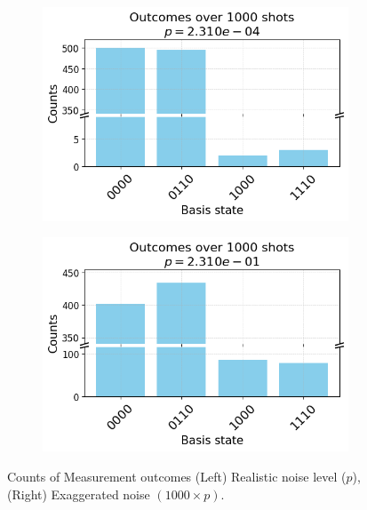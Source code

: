 \documentclass[9pt,a4paper,twocolumn,twoside]{tau-class/tau}
\begin{document}
\begin{figure}[ht]
    \centering
    \begin{subfigure}[b]{0.24\textwidth}
        \includegraphics[width=\linewidth]{figures/new_counts_hist_p_real.png}
    \end{subfigure}
    \hfill
    \begin{subfigure}[b]{0.24\textwidth}
        \includegraphics[width=\linewidth]{figures/new_counts_hist_p_1000x.png}
       \end{subfigure}
\vspace{-10pt} %
    \caption{Counts of Measurement outcomes (Left) Realistic noise level ($p$), (Right) Exaggerated noise \((1000 \times p)\).}
    \label{fig:side_by_side_histograms}
\end{figure}
\end{document}
